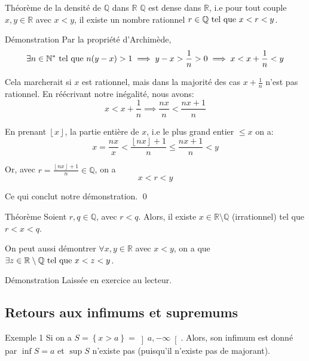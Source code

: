 \documentclass{article}
\begin{document}
\begin{parag}{Théorème de la densité de $\mathbb{Q}$ dans $\mathbb{R}$}
    $\mathbb{Q}$ est dense dans $\mathbb{R}$, i.e pour tout couple $x,y \in \mathbb{R}$ avec $x < y$, il existe un nombre rationnel $r \in \mathbb{Q} \text{ tel que } x < r < y$.

    \begin{subparag}{Démonstration}
    Par la propriété d'Archimède, \[\exists n \in \mathbb{N}^* \telque n\left(y - x\right) > 1 \implies y - x > \frac{1}{n} > 0 \implies x < x + \frac{1}{n} < y\]

    Cela marcherait si $x$ est rationnel, mais dans la majorité des cas $x + \frac{1}{n}$ n'est pas rationnel. En réécrivant notre inégalité, nous avons:
    \[x < x + \frac{1}{n} \implies \frac{nx}{n} < \frac{nx + 1}{n}\]

    En prenant $\left\lfloor x \right\rfloor $, la partie entière de $x$, i.e le plus grand entier $\leq x$ on a:
    \[x = \frac{nx}{x} < \frac{\left\lfloor nx \right\rfloor + 1}{n} \leq \frac{nx + 1}{n} <y\]

    Or, avec $r = \frac{\left\lfloor nx \right\rfloor + 1}{n} \in \mathbb{Q}$, on a
    \[x < r < y\]

    Ce qui conclut notre démonstration. \qed
    \end{subparag}

\end{parag}

\begin{parag}{Théorème}
    Soient $r,q \in \mathbb{Q}$, avec $r < q$. Alors, il existe $x \in \mathbb{R} \setminus \mathbb{Q}$ (irrationnel) tel que $r < x < q$.

    On peut aussi démontrer $\forall x,y \in \mathbb{R}$ avec $x < y$, on a que $\exists z \in \mathbb{R} \setminus \mathbb{Q} \text{ tel que } x < z < y$.

    \begin{subparag}{Démonstration}
        Laissée en exercice au lecteur.
    \end{subparag}

\end{parag}


\subsection{Retours aux infimums et supremums}


\begin{parag}{Exemple 1}
    Si on a $S = \left\{x > a\right\} = \left]a, -\infty\right[$. Alors, son infimum est donné par $\inf S = a$ et $\sup S$ n'existe pas (puisqu'il n'existe pas de majorant).
\end{parag}
\end{document}
